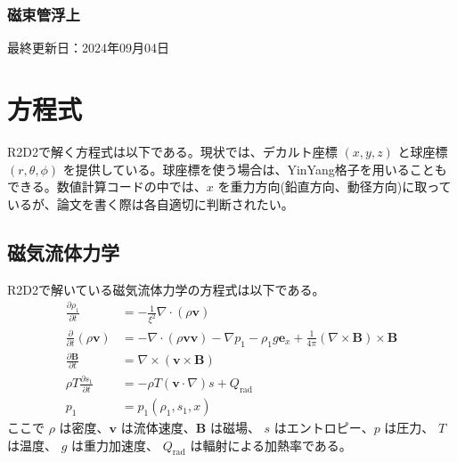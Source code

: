 \documentclass[letterpaper,10pt,dvipdfmx,report]{sphinxmanual}
\begin{document}
\subsection{磁束管浮上}
\label{\detokenize{typical_case:id14}}
\sphinxAtStartPar
最終更新日：2024年09月04日

\sphinxstepscope


\chapter{方程式}
\label{\detokenize{equation:id1}}\label{\detokenize{equation::doc}}
\sphinxAtStartPar
R2D2で解く方程式は以下である。現状では、デカルト座標 \((x,y,z)\)  と球座標 \((r,\theta,\phi)\) を提供している。球座標を使う場合は、Yin\sphinxhyphen{}Yang格子を用いることもできる。数値計算コードの中では、\(x\) を重力方向(鉛直方向、動径方向)に取っているが、論文を書く際は各自適切に判断されたい。


\section{磁気流体力学}
\label{\detokenize{equation:id2}}
\sphinxAtStartPar
R2D2で解いている磁気流体力学の方程式は以下である。
\begin{equation*}
\begin{split}\frac{\partial \rho_1}{\partial t} &= - \frac{1}{\xi^2}\nabla\cdot
\left(\rho \boldsymbol{v}\right) \\
\frac{\partial}{\partial t}\left(\rho \boldsymbol{v}\right) &=
-\nabla\cdot\left(\rho\boldsymbol{vv}\right)
- \nabla p_1 - \rho_1 g\boldsymbol{e}_x
+\frac{1}{4\pi}\left(\nabla\times\boldsymbol{B}\right)
\times\boldsymbol{B} \\
\frac{\partial \boldsymbol{B}}{\partial t} &=
\nabla\times\left(\boldsymbol{v\times B}\right)
\\
\rho T \frac{\partial s_1}{\partial t} &= -\rho T
\left(\boldsymbol{v}\cdot\nabla\right) s + Q_\mathrm{rad} \\
p_1 &= p_1(\rho_1,s_1,x)\end{split}
\end{equation*}
\sphinxAtStartPar
ここで \(\rho\) は密度、\(\boldsymbol{v}\) は流体速度、\(\boldsymbol{B}\) は磁場、 \(s\) はエントロピー、\(p\) は圧力、 \(T\) は温度、 \(g\) は重力加速度、 \(Q_\mathrm{rad}\) は輻射による加熱率である。
\end{document}
